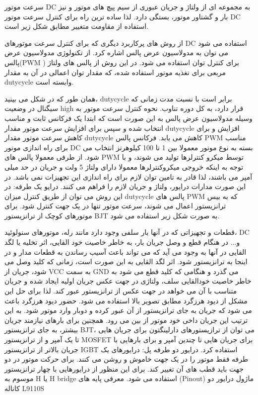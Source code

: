 
سرعت موتور DC به مجموعه ای از ولتاژ و جریان عبوری از سیم پیچ های موتور و نیز بار و گشتاور موتور، بستگی دارد. لذا ساده ترین راه برای کنترل سرعت موتور DC استفاده از مقاومت متغییر مطابق شکل زیر است.

از روش های پرکاربرد دیگری که برای کنترل سرعت موتورهای DC استفاده می شود می توان به مدولاسیون عرض پالس اشاره کرد. از تکنولوژی مدولاسیون عرض پالس(PWM ) برای کنترل توان استفاده می شود. در این روش از پالس های ولتاژ مربعی برای تغذیه موتور استفاده شده، که مقدار توان اعمالی در آن به مقدار dutycycle وابسته است.

همان طور که در شکل می بینید، dutycycle برابر است با نسبت مدت زمانی که سیگنال در وضعیت high قرار دارد، به کل دوره تناوب. نحوه کنترل سرعت موتور به وسیله مدولاسیون عرض پالس به این صورت است که ابتدا یک فرکانس ثابت و مناسب انتخاب شده و سپس برای افزایش سرعت موتور مقدار dutycycle افزایش و برای کاهش سرعت موتور مقدار dutycycle کاهش می یابد. فرکانس پالس PWM مناسب برای راه اندازی موتور DC بسته به نوع موتور معمولا بین 1 تا 100 کیلوهرتز انتخاب می شود. از طرفی معمولا پالس های PWM توسط میکرو کنترلرها تولید می شوند، و با توجه به اینکه خروجی میکروکنترلرها معمولا دارای ولتاژ 5 ولت و جریان در حد میلی آمپر می باشند، لذا قادر به تامین توان لازم برای راه اندازی این تجهیزات نمی باشد. در این صورت مدارات درایور، ولتاژ و جریان لازم را فراهم می کنند.
درایو یک طرفه:
در این روش می توان از طریق کنترل میزان dutycycle پالس های PWM که به بیس ترانزیستور اعمال می شوند، سرعت موتور تنها در یک جهت کنترل شود. برای موتورهای کوچک از ترانزیستور BJT به صورت شکل زیر استفاده می شود.

قطعات و تجهیزاتی که در آنها بار سلفی وجود دارد مانند رله، موتورهای سنولوئید، DC و... در هنگام قطع و وصل جریان بار، به خاطر خاصیت خود القایی، اثر تخلیه یا لگد القایی در آنها به وجود می آید که می تواند باعث آسیب رساندن به قطعات مدار و در اینجا به ترانزیستور شود. اثر لگد القایی به این صورت است، زمانی که کلید وصل می شود، جریان از VCC به سمت GND  می گذرد و هنگامی که کلید قطع می شود به خاطر خاصیت خودالقایی سلف، ولتاژی در جهت عکس جریان اولیه ایجاد شده و جریان متناسب با آن می خواهد در جهت عکس از ترانزیستور عبور کند. لذا برای حل این مشکل از دیود هرزگرد مطابق تصویر بالا استفاده می شود. حضور دیود هرزگرد باعث می شود که جریان به جای ترانزیستور از آن عبور کرده و دوبار وارد موتور شود. به این ترتیب این جریان داخی خود موتور از بین می رود.
همچنین برای بارهای نیازمند جریان بیشتر، به جای ترانزیستور BJT، می توان از ترازیستورهای دارلینگتون برای جریان هایی تا یک آمپر و از ترانزیستور MOSFET برای جریان هایی تا چندین آمپر و برای بارهایی با جریان بالاتر از ترانزیستور IGBT استفاده کرد.
درایور دو طرفه پل:
درایورهای یک طرفه فقط موتور را در یک جهت خاموش و روشن می کنند. برای حرکت موتور در دو جهت باید قطب های آن تغییر کند. برای این منظور از درایورهایی با چهار ترانزیستور موسوم به H یا H bridge استفاده می شود.
معرفی پایه های (Pinout) ماژول درایور دو کاناله L9110S
		 				 				
